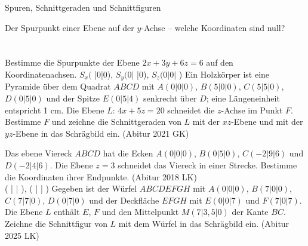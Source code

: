 \setcounter{aufgabe}{15}

\begin{aufgabe}{Spuren, Schnittgeraden und Schnittfiguren}
\begin{teile}
\teil Der Spurpunkt einer Ebene auf der $y$-Achse – welche Koordinaten sind null? \\  \\  \\ 
\teil Bestimme die Spurpunkte der Ebene $2x + 3y + 6z = 6$ auf den Koordinatenachsen. $S_x($ \leerfeld |0|0), $S_y(0|$ \leerfeld |0), $S_z(0|0|$ \leerfeld )
\teil Ein Holzkörper ist eine Pyramide über dem Quadrat $ABCD$ mit $A(0|0|0)$, $B(5|0|0)$, $C(5|5|0)$, $D(0|5|0)$ und der Spitze $E(0|5|4)$ senkrecht über $D$; eine Längeneinheit entspricht 1 cm. Die Ebene $L$: $4x + 5z = 20$ schneidet die $z$-Achse im Punkt $F$. Bestimme $F$ und zeichne die Schnittgeraden von $L$ mit der $xz$-Ebene und mit der $yz$-Ebene in das Schrägbild ein. \hfill (Abitur 2021 GK)

\begin{ksys3}[xyz,x1min=0,x1max=6,x2min=0,x2max=6,x3min=0,x3max=5]  \end{ksys3}
\teil Das ebene Viereck $ABCD$ hat die Ecken $A(0|0|0)$, $B(0|5|0)$, $C(-2|9|6)$ und $D(-2|4|6)$. Die Ebene $z = 3$ schneidet das Viereck in einer Strecke. Bestimme die Koordinaten ihrer Endpunkte. \hfill (Abitur 2018 LK) \\ ( \leerfeld | \leerfeld | \leerfeld ), ( \leerfeld | \leerfeld | \leerfeld )
\teil Gegeben ist der Würfel $ABCDEFGH$ mit $A(0|0|0)$, $B(7|0|0)$, $C(7|7|0)$, $D(0|7|0)$ und der Deckfläche $EFGH$ mit $E(0|0|7)$ und $F(7|0|7)$. Die Ebene $L$ enthält $E$, $F$ und den Mittelpunkt $M(7|3{,}5|0)$ der Kante $BC$. Zeichne die Schnittfigur von $L$ mit dem Würfel in das Schrägbild ein. \hfill (Abitur 2025 LK)


\end{teile}
\end{aufgabe}
